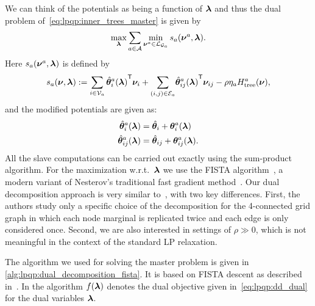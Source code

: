 We can think of the potentials as being a function of $\bm{\lambda}$ and thus the
dual problem of~\eqref{eq:lpqp:inner_trees_master} is given by
\begin{equation}
    \max_{\bm{\lambda}} \sum_{a \in \mathcal{A}} \min_{\bm{\nu}^{a}
    \in \mathcal{L}_{\mathcal{G}_a}} 
    s_{a}(\bm{\nu}^{a}, \bm{\lambda}).
    \label{eq:lpqp:dd_dual}
\end{equation}
Here $s_{a}(\bm{\nu}^{a}, \bm{\lambda})$ is defined by
\[
s_{a}(\bm{\nu}, \bm{\lambda}) := \sum_{i\in \mathcal{V}_a}
    {\hat{\bm{\theta}}_i^{a}(\bm{\lambda})}^{\mathsf{T}}  \bm{\nu}_{i}
    + \sum_{(i,j) \in \mathcal{E}_a} \!
    {{\hat{\bm{\theta}}_{ij}^{a}(\bm{\lambda})}}^{\mathsf{T}} \bm{\nu}_{ij}
    - \rho \eta_{a} H_{\text{tree}}^{a} (\bm{\nu}),
\]
and the modified potentials are given as:
\begin{align*}
    \hat{\bm{\theta}}_i^{a}(\bm{\lambda}) & = \hat{\bm{\theta}}_i +
    \bm{\theta}_i^{a}(\bm{\lambda}) \\
    \hat{\bm{\theta}}_{ij}^{a}(\bm{\lambda}) & = \hat{\bm{\theta}}_{ij} +
    \bm{\theta}_{ij}^{a}(\bm{\lambda}).
\end{align*}
All the slave computations can be carried out exactly using the sum-product
algorithm. For the maximization w.r.t.\ $\bm{\lambda}$ we use the
\ac{FISTA} algorithm~\parencite{Beck2009}, a modern variant of Nesterov's traditional fast
gradient method~\parencite{Nesterov1983}. Our dual decomposition approach is very
similar to~\parencite{Savchynskyy2011}, with two key differences. First, the authors study
only a specific choice of the decomposition for the 4-connected grid graph in
which each node marginal is replicated twice and each edge is only considered once. Second, we
are also interested in settings of $\rho \gg 0$, which is not meaningful in
the context of the standard \ac{LP} relaxation.

The algorithm we used for solving the master problem is given in
\autoref{alg:lpqp:dual_decomposition_fista}. It is based
on \ac{FISTA} descent as described in~\parencite{Vandenberghe2012}. In
the algorithm $f(\bm{\lambda})$ denotes the dual objective given
in~\eqref{eq:lpqp:dd_dual} for the dual variables $\bm{\lambda}$.

